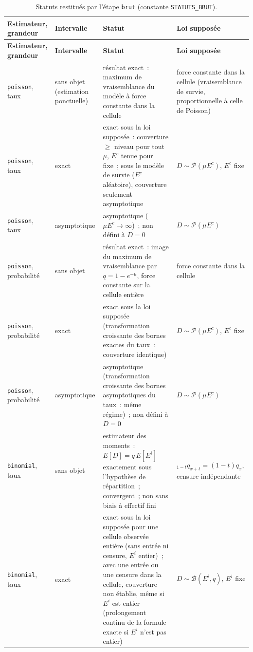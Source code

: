 \documentclass[a4paper,11pt]{article}
\newcommand{\code}[1]{\texttt{\small #1}}
\begin{document}
{\small
{}
\begin{longtable}{@{}p{2.6cm}p{2.3cm}p{6.0cm}p{3.7cm}@{}}
\caption{Statuts restitués par l'étape \code{brut} (constante
\code{STATUTS\_BRUT}).}
\label{tab:statuts-brut}\\
\rowcolor{tableheader}
\textcolor{financeblue}{\textbf{Estimateur, grandeur}} &
\textcolor{financeblue}{\textbf{Intervalle}} &
\textcolor{financeblue}{\textbf{Statut}} &
\textcolor{financeblue}{\textbf{Loi supposée}} \\
\endfirsthead
\rowcolor{tableheader}
\textcolor{financeblue}{\textbf{Estimateur, grandeur}} &
\textcolor{financeblue}{\textbf{Intervalle}} &
\textcolor{financeblue}{\textbf{Statut}} &
\textcolor{financeblue}{\textbf{Loi supposée}} \\
\endhead
\code{poisson}, taux & sans objet (estimation ponctuelle) & résultat exact~: maximum de vraisemblance du modèle à force constante dans la cellule & force constante dans la cellule (vraisemblance de survie, proportionnelle à celle de Poisson) \\
\code{poisson}, taux & exact & exact sous la loi supposée~: couverture $\ge$ niveau pour tout $\mu$, $E^c$ tenue pour fixe~; sous le modèle de survie ($E^c$ aléatoire), couverture seulement asymptotique & $D \sim \mathcal{P}(\mu E^c)$, $E^c$ fixe \\
\code{poisson}, taux & asymptotique & asymptotique ($\mu E^c \to \infty$)~; non défini à $D = 0$ & $D \sim \mathcal{P}(\mu E^c)$ \\
\code{poisson}, probabilité & sans objet & résultat exact~: image du maximum de vraisemblance par $q = 1 - e^{-\mu}$, force constante sur la cellule entière & force constante dans la cellule \\
\code{poisson}, probabilité & exact & exact sous la loi supposée (transformation croissante des bornes exactes du taux~: couverture identique) & $D \sim \mathcal{P}(\mu E^c)$, $E^c$ fixe \\
\code{poisson}, probabilité & asymptotique & asymptotique (transformation croissante des bornes asymptotiques du taux~: même régime)~; non défini à $D = 0$ & $D \sim \mathcal{P}(\mu E^c)$ \\
\code{binomial}, taux & sans objet & estimateur des moments~: $E[D] = q\,E[E^i]$ exactement sous l'hypothèse de répartition~; convergent~; non sans biais à effectif fini & ${}_{1-t}q_{x+t} = (1 - t)q_x$, censure indépendante \\
\code{binomial}, taux & exact & exact sous la loi supposée pour une cellule observée entière (sans entrée ni censure, $E^i$ entier)~; avec une entrée ou une censure dans la cellule, couverture non établie, même si $E^i$ est entier (prolongement continu de la formule exacte si $E^i$ n'est pas entier) & $D \sim \mathcal{B}(E^i, q)$, $E^i$ fixe \\

\end{longtable}}
\end{document}

